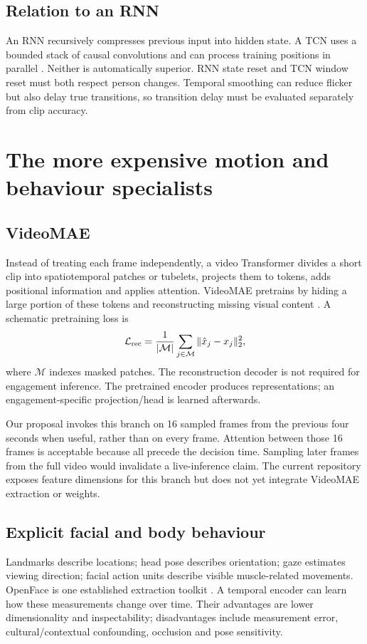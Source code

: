 \documentclass[10pt,a4paper]{article}
\begin{document}
\subsection{Relation to an RNN}
An RNN recursively compresses previous input into hidden state. A TCN uses a bounded stack of causal convolutions and can process training positions in parallel \cite{tcnfoundation}. Neither is automatically superior. RNN state reset and TCN window reset must both respect person changes. Temporal smoothing can reduce flicker but also delay true transitions, so transition delay must be evaluated separately from clip accuracy.

\section{The more expensive motion and behaviour specialists}
\subsection{VideoMAE}
Instead of treating each frame independently, a video Transformer divides a short clip into spatiotemporal patches or tubelets, projects them to tokens, adds positional information and applies attention. VideoMAE pretrains by hiding a large portion of these tokens and reconstructing missing visual content \cite{videomae}. A schematic pretraining loss is
\begin{equation}
\mathcal L_{\rm rec}=\frac1{|\mathcal M|}\sum_{j\in\mathcal M}
\|\hat x_j-x_j\|_2^2,
\end{equation}
where $\mathcal M$ indexes masked patches. The reconstruction decoder is not required for engagement inference. The pretrained encoder produces representations; an engagement-specific projection/head is learned afterwards.

Our proposal invokes this branch on 16 sampled frames from the previous four seconds when useful, rather than on every frame. Attention between those 16 frames is acceptable because all precede the decision time. Sampling later frames from the full video would invalidate a live-inference claim. The current repository exposes feature dimensions for this branch but does not yet integrate VideoMAE extraction or weights.

\subsection{Explicit facial and body behaviour}
Landmarks describe locations; head pose describes orientation; gaze estimates viewing direction; facial action units describe visible muscle-related movements. OpenFace is one established extraction toolkit \cite{openface}. A temporal encoder can learn how these measurements change over time. Their advantages are lower dimensionality and inspectability; disadvantages include measurement error, cultural/contextual confounding, occlusion and pose sensitivity.
\end{document}
